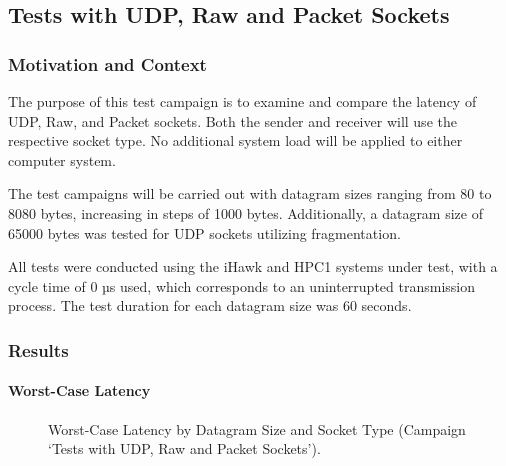 \subsection{Tests with UDP, Raw and Packet Sockets} \label{chap:PerfSockType}
\subsubsection{Motivation and Context}
The purpose of this test campaign is to examine and compare the latency of UDP, Raw, and Packet sockets. Both the sender and receiver will use the respective socket type. No additional system load will be applied to either computer system.

The test campaigns will be carried out with datagram sizes ranging from 80 to 8080 bytes, increasing in steps of 1000 bytes. Additionally, a datagram size of 65000 bytes was tested for UDP sockets utilizing fragmentation.

All tests were conducted using the iHawk and HPC1 systems under test, with a cycle time of 0 µs used, which corresponds to an uninterrupted transmission process. The test duration for each datagram size was 60 seconds.

\subsubsection{Results}
\paragraph{Worst-Case Latency}

\begin{figure}[h!]
  \centering
  \caption{Worst-Case Latency by Datagram Size and Socket Type (Campaign `Tests with UDP, Raw and Packet Sockets').}
  \label{fig:SockTypeWc}
\end{figure}

